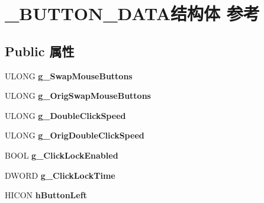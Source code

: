 \hypertarget{struct___b_u_t_t_o_n___d_a_t_a}{}\section{\+\_\+\+B\+U\+T\+T\+O\+N\+\_\+\+D\+A\+T\+A结构体 参考}
\label{struct___b_u_t_t_o_n___d_a_t_a}
\subsection*{Public 属性}
\begin{DoxyCompactItemize}
\item 
\mbox{\label{struct___b_u_t_t_o_n___d_a_t_a_ae5b0b3f1f9647515e8ba005833fb1a6d}} 
U\+L\+O\+NG {\bfseries g\+\_\+\+Swap\+Mouse\+Buttons}
\item 
\mbox{\label{struct___b_u_t_t_o_n___d_a_t_a_aae8e1edfbeced3e365f22a16783b6ac5}} 
U\+L\+O\+NG {\bfseries g\+\_\+\+Orig\+Swap\+Mouse\+Buttons}
\item 
\mbox{\label{struct___b_u_t_t_o_n___d_a_t_a_ad72e226beb2d02253022965d71d28bcb}} 
U\+L\+O\+NG {\bfseries g\+\_\+\+Double\+Click\+Speed}
\item 
\mbox{\label{struct___b_u_t_t_o_n___d_a_t_a_a008bbe8f3b4101c6e88bae8f9c2659e2}} 
U\+L\+O\+NG {\bfseries g\+\_\+\+Orig\+Double\+Click\+Speed}
\item 
\mbox{\label{struct___b_u_t_t_o_n___d_a_t_a_a4ce49acb3f64a234b1bde14cb21c2bbc}} 
B\+O\+OL {\bfseries g\+\_\+\+Click\+Lock\+Enabled}
\item 
\mbox{\label{struct___b_u_t_t_o_n___d_a_t_a_ac71916fe69c7f7521350616279afd30f}} 
D\+W\+O\+RD {\bfseries g\+\_\+\+Click\+Lock\+Time}
\item 
\mbox{\label{struct___b_u_t_t_o_n___d_a_t_a_a0c9284404b478b2adc1a7c863e73aeae}} 
H\+I\+C\+ON {\bfseries h\+Button\+Left}
\item 
\mbox{\label{struct___b_u_t_t_o_n___d_a_t_a_a29baf2d9bae41fd90e95e316dc4239d5}} 

\end{DoxyCompactItemize}

